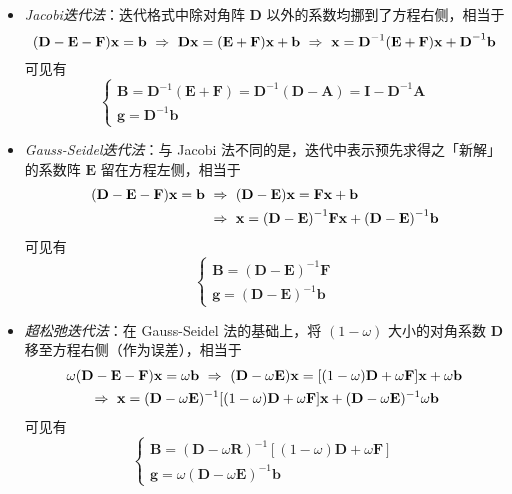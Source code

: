 \begin{itemize}\tl
    \item \emph{Jacobi迭代法}：迭代格式中除对角阵 $\mathbf{D}$ 以外的系数均挪到了方程右侧，相当于
    \[\mathbf{(D-E-F)x=b}\ \Rightarrow\ \mathbf{Dx=(E+F)x+b}\ \Rightarrow\ \mathbf{x=D}^{-1}\mathbf{(E+F)x+D}^{-1}\mathbf{b}\]
    可见有
    \begin{equation}
    \begin{cases}\mathbf{B=D}^{-1}\mathbf{(E+F)=D}^{-1}(\mathbf{D-A})=\mathbf{I-D}^{-1}\mathbf{A}\\\mathbf{g=D}^{-1}\mathbf{b}\end{cases}
    \end{equation}
    \item \emph{Gauss-Seidel迭代法}：与 Jacobi 法不同的是，迭代中表示预先求得之「新解」的系数阵 $\mathbf{E}$ 留在方程左侧，相当于
    \begin{align*}
    \mathbf{(D-E-F)x=b}&\ \Rightarrow\ \mathbf{(D-E)x=Fx+b}\\&\ \Rightarrow\ \mathbf{x=(D-E)}^{-1}\mathbf{Fx+(D-E)}^{-1}\mathbf{b}
    \end{align*}
    可见有
    \begin{equation}
    \begin{cases}
    \mathbf{B=(D-E)}^{-1}\mathbf{F}\\
    \mathbf{g=(D-E)}^{-1}\mathbf{b}
    \end{cases}
    \end{equation}
    \item \emph{超松弛迭代法}：在 Gauss-Seidel 法的基础上，将 $(1-\omega)$ 大小的对角系数 $\mathbf{D}$ 移至方程右侧（作为误差），相当于
    \begin{gather*}
    \omega\mathbf{(D-E-F)x}=\omega\mathbf{b}\ \Rightarrow\ (\mathbf{D}-\omega\mathbf{E})\mathbf{x}=[(1-\omega)\mathbf{D}+\omega\mathbf{F}]\mathbf{x}+\omega\mathbf{b}\\
    \ \Rightarrow\ \mathbf{x}=(\mathbf{D}-\omega\mathbf{E})^{-1}[(1-\omega)\mathbf{D}+\omega \mathbf{F}]\mathbf{x}+(\mathbf{D}-\omega\mathbf{E})^{-1}\omega\mathbf{b}
    \end{gather*}
    可见有
    \begin{equation}
    \begin{cases}
    \mathbf{B}=(\mathbf{D}-\omega\mathbf{R})^{-1}[(1-\omega)\mathbf{D}+\omega\mathbf{F}]\\
    \mathbf{g}=\omega(\mathbf{D}-\omega\mathbf{E})^{-1}\mathbf{b}
    \end{cases}
    \end{equation}
\end{itemize}



